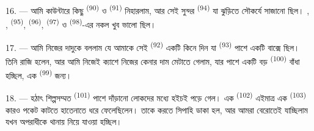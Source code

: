 16. --- আমি কাউন্টারে কিছু  \textsuperscript{(90)} ও
 \textsuperscript{(91)} নিহারলাম, আর সেই সুন্দর
 \textsuperscript{(94)} যা ঝুড়িতে সৌকর্যে সাজানো ছিল।
, ,  \textsuperscript{(95)},
 \textsuperscript{(96)},  \textsuperscript{(97)}
ও  \textsuperscript{(98)}-এর নকল খুব ভালো ছিল।

\VUsaut{4.4mm}
\VUsaut{2.8mm}

17. --- আমি নিজের দাদুকে বললাম যে আমাকে সেই 
\textsuperscript{(92)} একটি কিনে দিন যা 
\textsuperscript{(93)} পাশে একটি বাক্সে ছিল। তিনি রাজি হলেন, আর আমি নিজেই ক্যাশে
নিজের কেনার দাম মেটাতে গেলাম, যার পাশে একটি বড় 
\textsuperscript{(100)} বাঁধা হচ্ছিল, এক  \textsuperscript{(99)}
জন্য।

18. --- হঠাৎ শিল্পসম্মত  \textsuperscript{(101)} পাশে
দাঁড়ানো লোকদের মধ্যে হইচই পড়ে গেল। এক  \textsuperscript{(102)}
এইমাত্র এক  \textsuperscript{(103)} কারও পকেট কাটতে
হাতেনাতে ধরে ফেলেছিলেন। তাকে  করতে সিপাহি ডাকা হল, আর আমরা
বেরোতেই যাচ্ছিলাম যখন অপরাধীকে থানায় নিয়ে যাওয়া হচ্ছিল।
\VUsaut{6.0mm}
\VUfilet{22mm}
